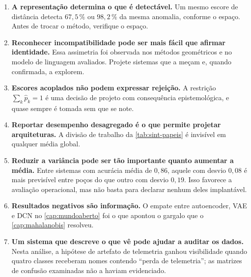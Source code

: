 \begin{enumerate}[leftmargin=*,itemsep=0.5em]

\item \textbf{A representação determina o que é detectável.} Um mesmo escore de
distância detecta $67{,}5\,\%$ ou $98{,}2\,\%$ da mesma anomalia, conforme o espaço.
Antes de trocar o método, verifique o espaço.

\item \textbf{Reconhecer incompatibilidade pode ser mais fácil que afirmar identidade.}
Essa assimetria foi observada nos métodos geométricos e no modelo de linguagem avaliados.
Projete sistemas que a meçam e, quando confirmada, a explorem.

\item \textbf{Escores acoplados não podem expressar rejeição.} A restrição
$\sum_k \hat{p}_k = 1$ é uma decisão de projeto com consequência epistemológica, e quase
sempre é tomada sem que se note.

\item \textbf{Reportar desempenho desagregado é o que permite projetar arquiteturas.} A
divisão de trabalho da \cref{tab:sint-papeis} é invisível em qualquer média global.

\item \textbf{Reduzir a variância pode ser tão importante quanto aumentar a média.}
Entre sistemas com acurácia média de $0{,}86$, aquele com desvio $0{,}08$ é mais
previsível entre poços do que outro com desvio $0{,}19$. Isso favorece a avaliação
operacional, mas não basta para declarar nenhum deles implantável.

\item \textbf{Resultados negativos são informação.} O empate entre autoencoder, VAE e DCN
no \cref{cap:mundoaberto} foi o que apontou o gargalo que o \cref{cap:mahalanobis}
resolveu.

\item \textbf{Um sistema que descreve o que vê pode ajudar a auditar os dados.} Nesta
análise, a hipótese de artefato de telemetria ganhou visibilidade quando quatro classes
receberam nomes contendo ``perda de telemetria''; as matrizes de confusão examinadas não
a haviam evidenciado.

\end{enumerate}

